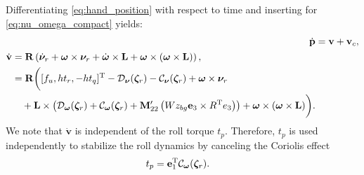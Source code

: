 Differentiating \eqref{eq:hand_position} with respect to time and inserting for \eqref{eq:nu_omega_compact} yields:
\begin{subequations}\label{eq:output_dynamics}
\begin{align}
    \dot{\mathbf{p}} &= \mathbf{v} + \mathbf{v}_c,\\
    \begin{split}
    \dot{\mathbf{v}} &= \mathbf{R}\left(\dot{\bm{\nu}}_r +\bm{\omega}\times \bm{\nu}_r + \dot{\bm{\omega}}\times \mathbf{L} +  \bm{\omega}\times (\bm{\omega}\times \mathbf{L})\right),\\ 
    &=\mathbf{R}\biggl([f_u,h t_r, -h t_q]^{\rm T} - \mathcal{D}_{\bm{\nu}}(\bm{\zeta}_r) - \mathcal{C}_{\bm{\nu}}(\bm{\zeta}_r) + \bm{\omega}\times\bm{\nu}_r \\ 
    & \quad + \mathbf{L}\times \left(\mathcal{D}_{\bm{\omega}}(\bm{\zeta}_r) + \mathcal{C}_{\bm{\omega}}(\bm{\zeta}_r) + \mathbf{M}_{22}^\prime\left(W z_{bg} \mathbf{e}_3 \times R^{\rm T} e_3\right)\right) + \bm{\omega}\times (\bm{\omega}\times \mathbf{L})\biggr).
    \end{split}
\end{align}
\end{subequations}
We note that $\dot{\mathbf{v}}$ is independent of the roll torque $t_p$. Therefore, $t_p$ is used independently to stabilize the roll dynamics by canceling the Coriolis effect
\begin{align}
        t_p &= \mathbf{e}_1^{\rm T} \mathcal{C}_{\bm{\omega}}(\bm{\zeta}_r). \label{eq:roll_torque}
\end{align}

